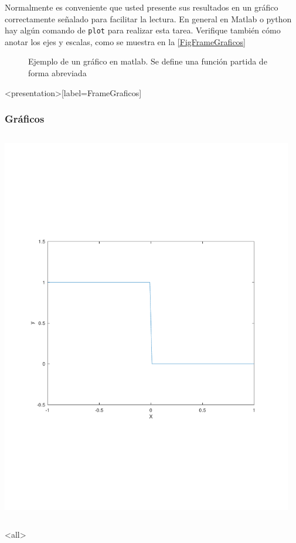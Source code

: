 Normalmente es conveniente que usted presente sus resultados en un gráfico correctamente 
señalado para facilitar la lectura. En general en Matlab o python hay algún comando de 
\texttt{plot} para realizar esta tarea. Verifique también cómo anotar los ejes y escalas, como se
muestra en la \autoref{FigFrameGraficos}

\begin{figure}
  \caption{
    \protect\label{FigFrameGraficos}
    Ejemplo de un gráfico en matlab. Se define una función partida de forma abreviada
  }


\end{figure}

\mode*

\begin{frame}<presentation>[label=FrameGraficos]
  \frametitle{Gráficos}
  \begin{columns}
      \includegraphics[width=\textwidth]{07-Graficos/partida.pdf}

      \begin{codeblock}
	
      \end{codeblock}



  \end{columns}

\end{frame}

\mode<all>
